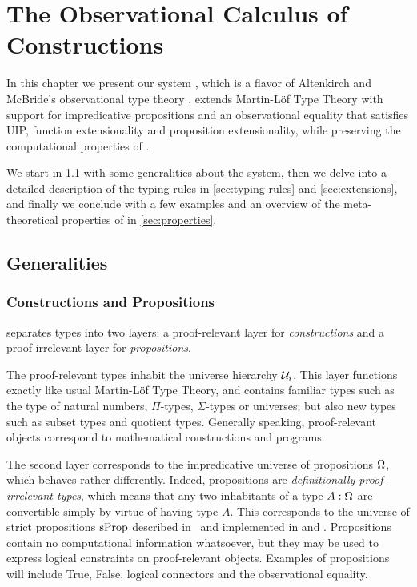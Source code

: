 \setchapterpreamble[u]{\margintoc}
\chapter{The Observational Calculus of Constructions}
\label{sec:type-theory-with}

In this chapter we present our system \SetoidCC, which is a flavor of 
Altenkirch and McBride's observational type theory \cite{altenkirchAl:plpv2007}.
% 
\SetoidCC extends Martin-Löf Type Theory with support for impredicative 
propositions and an observational equality that satisfies UIP, function 
extensionality and proposition extensionality, while preserving
the computational properties of \MLTT. 

We start in \cref{sec:generalities} with some generalities about the system, 
then we delve into a detailed description of the typing rules in 
\cref{sec:typing-rules} and \cref{sec:extensions}, and finally we conclude 
with a few examples and an overview of the meta-theoretical properties of
\SetoidCC in \cref{sec:properties}.

\section{Generalities}
\label{sec:generalities}

\subsection{Constructions and Propositions}

\SetoidCC separates types into two layers: a proof-relevant layer for 
\emph{constructions} and a proof-irrelevant layer for \emph{propositions}. 

The proof-relevant types inhabit the universe hierarchy \( \mathcal{U}_i \).
% 
This layer functions exactly like usual Martin-Löf Type Theory, and
contains familiar types
such as the type of natural numbers, \( \Pi \)-types, \( \Sigma \)-types or 
universes; but also new types such as subset types and quotient types.
% 
Generally speaking, proof-relevant objects correspond to mathematical 
constructions and programs.

The second layer corresponds to the impredicative universe of propositions 
\( \Omega \), which behaves rather differently.
% 
Indeed, propositions are \emph{definitionally proof-irrelevant types}, which 
means that any two inhabitants of a type \( A : \Omega \) are convertible
simply by virtue of having type \( A \). 
% 
This corresponds to the universe of strict propositions
\( \mathrm{sProp} \) described in~ and implemented 
in \Coq and \Lean.
% 
Propositions contain no computational information whatsoever, but they may be 
used to express logical constraints on proof-relevant objects.
% 
Examples of propositions will include True, False, logical connectors and the 
observational equality.

